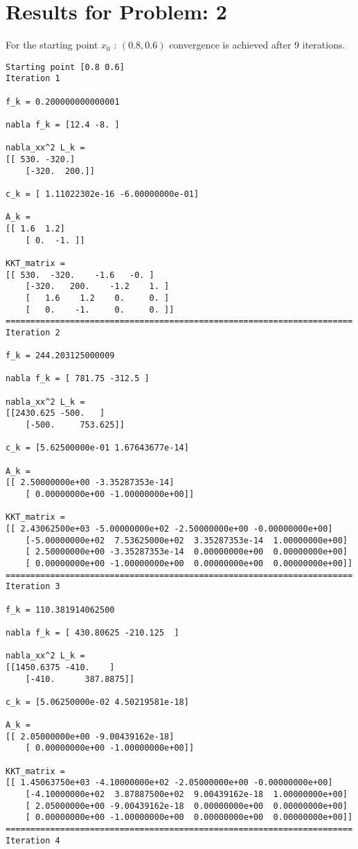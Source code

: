 \documentclass{article}
\begin{document}
\section*{Results for Problem: 2}
For the starting point $x_0$ :  $(0.8, 0.6)$ convergence is achieved after 9 iterations.
\begin{verbatim}
Starting point [0.8 0.6]
Iteration 1

f_k = 0.200000000000001

nabla f_k = [12.4 -8. ]

nabla_xx^2 L_k = 
[[ 530. -320.]
    [-320.  200.]]

c_k = [ 1.11022302e-16 -6.00000000e-01]

A_k = 
[[ 1.6  1.2]
    [ 0.  -1. ]]

KKT_matrix = 
[[ 530.  -320.    -1.6   -0. ]
    [-320.   200.    -1.2    1. ]
    [   1.6    1.2    0.     0. ]
    [   0.    -1.     0.     0. ]]
======================================================================
Iteration 2

f_k = 244.203125000009

nabla f_k = [ 781.75 -312.5 ]

nabla_xx^2 L_k = 
[[2430.625 -500.   ]
    [-500.     753.625]]

c_k = [5.62500000e-01 1.67643677e-14]

A_k = 
[[ 2.50000000e+00 -3.35287353e-14]
    [ 0.00000000e+00 -1.00000000e+00]]

KKT_matrix = 
[[ 2.43062500e+03 -5.00000000e+02 -2.50000000e+00 -0.00000000e+00]
    [-5.00000000e+02  7.53625000e+02  3.35287353e-14  1.00000000e+00]
    [ 2.50000000e+00 -3.35287353e-14  0.00000000e+00  0.00000000e+00]
    [ 0.00000000e+00 -1.00000000e+00  0.00000000e+00  0.00000000e+00]]
======================================================================
Iteration 3

f_k = 110.381914062500

nabla f_k = [ 430.80625 -210.125  ]

nabla_xx^2 L_k = 
[[1450.6375 -410.    ]
    [-410.      387.8875]]

c_k = [5.06250000e-02 4.50219581e-18]

A_k = 
[[ 2.05000000e+00 -9.00439162e-18]
    [ 0.00000000e+00 -1.00000000e+00]]

KKT_matrix = 
[[ 1.45063750e+03 -4.10000000e+02 -2.05000000e+00 -0.00000000e+00]
    [-4.10000000e+02  3.87887500e+02  9.00439162e-18  1.00000000e+00]
    [ 2.05000000e+00 -9.00439162e-18  0.00000000e+00  0.00000000e+00]
    [ 0.00000000e+00 -1.00000000e+00  0.00000000e+00  0.00000000e+00]]
======================================================================
Iteration 4


\end{verbatim}
\end{document}
